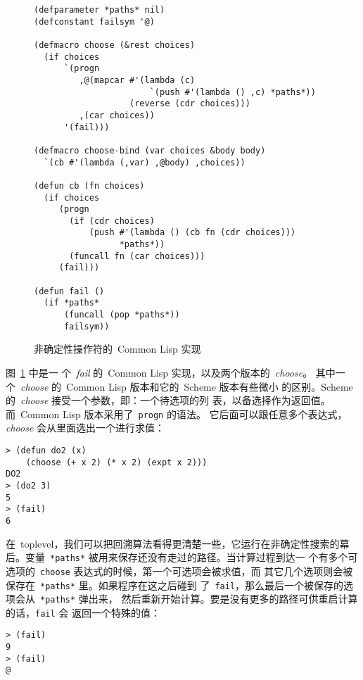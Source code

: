 \begin{figure}
\begin{lstlisting}
(defparameter *paths* nil)
(defconstant failsym '@)

(defmacro choose (&rest choices)
  (if choices
      `(progn
         ,@(mapcar #'(lambda (c)
                       `(push #'(lambda () ,c) *paths*))
                   (reverse (cdr choices)))
         ,(car choices))
      '(fail)))

(defmacro choose-bind (var choices &body body)
  `(cb #'(lambda (,var) ,@body) ,choices))

(defun cb (fn choices)
  (if choices
     (progn
       (if (cdr choices)
           (push #'(lambda () (cb fn (cdr choices)))
                 *paths*))
       (funcall fn (car choices)))
     (fail)))

(defun fail ()
  (if *paths*
      (funcall (pop *paths*))
      failsym))
\end{lstlisting}
\caption{非确定性操作符的~Common Lisp 实现}
\label{fig:nondeterministic_operators_in_common_lisp}
\end{figure}

图~\ref{fig:nondeterministic_operators_in_common_lisp} 中是一
个~\emph{fail} 的~Common Lisp 实现，以及两个版本的~\emph{choose}。
其中一个~\emph{choose} 的~Common Lisp 版本和它的~Scheme 版本有些微小
的区别。Scheme 的~\emph{choose} 接受一个参数，即：一个待选项的列
表，以备选择作为返回值。而~Common Lisp 版本采用了~\texttt{progn} 的语法。
它后面可以跟任意多个表达式，\emph{choose} 会从里面选出一个进行求值：
\begin{lstlisting}
> (defun do2 (x)
    (choose (+ x 2) (* x 2) (expt x 2)))
DO2
> (do2 3)
5
> (fail)
6
\end{lstlisting}

在~toplevel，我们可以把回溯算法看得更清楚一些，它运行在非确定性搜索的幕
后。变量~\texttt{*paths*} 被用来保存还没有走过的路径。当计算过程到达一
个有多个可选项的~\texttt{choose} 表达式的时候，第一个可选项会被求值，而
其它几个选项则会被保存在~\texttt{*paths*} 里。如果程序在这之后碰到
了~\texttt{fail}，那么最后一个被保存的选项会从~\texttt{*paths*} 弹出来，
然后重新开始计算。要是没有更多的路径可供重启计算的话，\texttt{fail} 会
返回一个特殊的值：
\begin{lstlisting}
> (fail)
9
> (fail)
@
\end{lstlisting}

